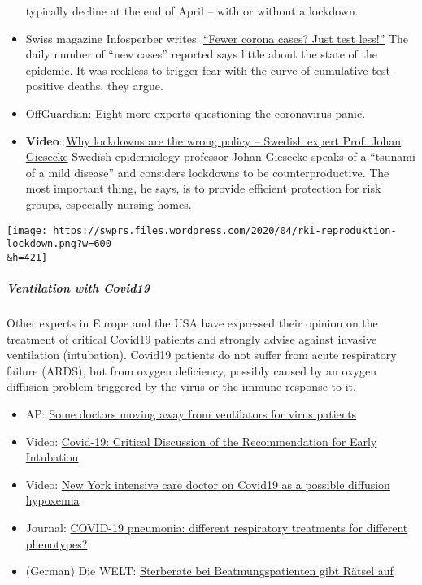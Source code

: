 \begin{itemize}
  typically decline at the end of April -- with or without a lockdown.
\item
  Swiss magazine Infosperber writes:
  \href{https://www.infosperber.ch/Artikel/Gesundheit/Weniger-Corona-Falle-Einfach-weniger-testen}{``Fewer
  corona cases? Just test less!''} The daily number of ``new cases''
  reported says little about the state of the epidemic. It was reckless
  to trigger fear with the curve of cumulative test-positive deaths,
  they argue.
\item
  OffGuardian:
  \href{https://off-guardian.org/2020/04/17/8-more-experts-questioning-the-coronavirus-panic/}{Eight
  more experts questioning the coronavirus panic}.
\item
  \textbf{Video}: \href{https://www.youtube.com/watch?v=bfN2JWifLCY}{Why
  lockdowns are the wrong policy -- Swedish expert Prof. Johan Giesecke}
  Swedish epidemiology professor Johan Giesecke speaks of a ``tsunami of
  a mild disease'' and considers lockdowns to be counterproductive. The
  most important thing, he says, is to provide efficient protection for
  risk groups, especially nursing homes.
\end{itemize}

\texttt{[image: https://swprs.files.wordpress.com/2020/04/rki-reproduktion-lockdown.png?w=600\\\&h=421]}

\hypertarget{ventilation-with-covid19}{%
\subparagraph{\texorpdfstring{\textbf{Ventilation with
Covid19}}{Ventilation with Covid19}}\label{ventilation-with-covid19}}

Other experts in Europe and the USA have expressed their opinion on the
treatment of critical Covid19 patients and strongly advise against
invasive ventilation (intubation). Covid19 patients do not suffer from
acute respiratory failure (ARDS), but from oxygen deficiency, possibly
caused by an oxygen diffusion problem triggered by the virus or the
immune response to it.

\begin{itemize}
\tightlist
\item
  AP: \href{https://apnews.com/8ccd325c2be9bf454c2128dcb7bd616d}{Some
  doctors moving away from ventilators for virus patients}
\item
  Video: \href{https://www.youtube.com/watch?v=QPlEUAVjxV8}{Covid-19:
  Critical Discussion of the Recommendation for Early Intubation}
\item
  Video: \href{https://www.youtube.com/watch?v=NmRlvX3VrAQ}{New York
  intensive care doctor on Covid19 as a possible diffusion hypoxemia}
\item
  Journal:
  \href{https://link.springer.com/article/10.1007/s00134-020-06033-2}{COVID-19
  pneumonia: different respiratory treatments for different phenotypes?}
\item
  (German) Die WELT:
  \href{https://www.welt.de/vermischtes/article207221877/Corona-Pandemie-Sterberate-bei-Beatmungspatienten-gibt-Raetsel-auf.html}{Sterberate
  bei Beatmungspatienten gibt Rätsel auf}
\end{itemize}

